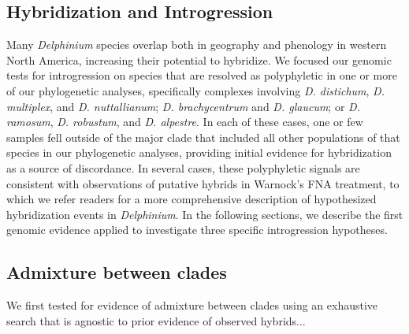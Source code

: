 \documentclass[11pt]{article}
\begin{document}
\subsection{Hybridization and Introgression}
Many \emph{Delphinium} species overlap both in geography and phenology in western 
North America, increasing their potential to hybridize. 
We focused our genomic tests for introgression on species that are resolved as 
polyphyletic in one or more of our phylogenetic analyses, specifically complexes
involving \emph{D. distichum}, \emph{D. multiplex}, and \emph{D. nuttallianum}; 
\emph{D. brachycentrum} and \emph{D. glaucum}; 
or \emph{D. ramosum}, \emph{D. robustum}, and \emph{D. alpestre}. 
% 
In each of these cases, one or few samples fell outside of the major clade that 
included all other populations of that species in our phylogenetic analyses, 
providing initial evidence for hybridization as a source of discordance. 
In several cases, these polyphyletic signals are consistent with observations of 
putative hybrids in Warnock’s FNA treatment, to which we refer readers for a more
comprehensive description of hypothesized hybridization events in \emph{Delphinium}. 
In the following sections, we describe the first genomic evidence applied to 
investigate three specific introgression hypotheses.


\subsection{Admixture between clades}

% 

We first tested for evidence of admixture between clades using an exhaustive
search that is agnostic to prior evidence of observed hybrids...
% 
\end{document}
